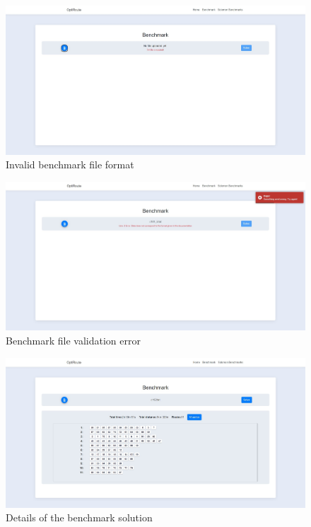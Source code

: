 \documentclass[a4paper,twoside,12pt]{book}
\begin{document}
\begin{figure}[H]
\centering
\includegraphics[width=\textwidth]{images/benchmarkInvalidFormat.jpg}
\caption{Invalid benchmark file format}
\label{fig:benchmarkInvalidFormat}
\end{figure}

\begin{figure}[H]
\centering
\includegraphics[width=\textwidth]{images/benchmarkInvalidFile.jpg}
\caption{Benchmark file validation error}
\label{fig:benchmarkInvalidFile}
\end{figure}

\begin{figure}[H]
\centering
\includegraphics[width=\textwidth]{images/benchmarkSolved.jpg}
\caption{Details of the benchmark solution}
\label{fig:benchmarkSolved}
\end{figure}
\end{document}

